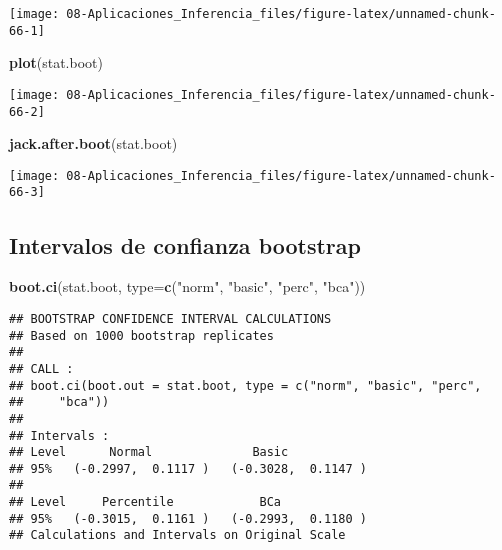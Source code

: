 \documentclass[
]{book}
\newenvironment{Shaded}{\begin{snugshade}}{\end{snugshade}}
\newcommand{\DataTypeTok}[1]{\textcolor[rgb]{0.13,0.29,0.53}{#1}}
\newcommand{\KeywordTok}[1]{\textcolor[rgb]{0.13,0.29,0.53}{\textbf{#1}}}
\newcommand{\NormalTok}[1]{#1}
\newcommand{\StringTok}[1]{\textcolor[rgb]{0.31,0.60,0.02}{#1}}
\theoremstyle{break}
\theoremstyle{definition}
\theoremstyle{definition}
\theoremstyle{definition}
\theoremstyle{remark}
\begin{document}
\begin{center}\texttt{[image: 08-Aplicaciones\_Inferencia\_files/figure-latex/unnamed-chunk-66-1]} \end{center}

\begin{Shaded}
\begin{Highlighting}[]
\KeywordTok{plot}\NormalTok{(stat.boot)}
\end{Highlighting}
\end{Shaded}

\begin{center}\texttt{[image: 08-Aplicaciones\_Inferencia\_files/figure-latex/unnamed-chunk-66-2]} \end{center}

\begin{Shaded}
\begin{Highlighting}[]
\KeywordTok{jack.after.boot}\NormalTok{(stat.boot)}
\end{Highlighting}
\end{Shaded}

\begin{center}\texttt{[image: 08-Aplicaciones\_Inferencia\_files/figure-latex/unnamed-chunk-66-3]} \end{center}

\hypertarget{intervalos-de-confianza-bootstrap}{%
\subsection{Intervalos de confianza bootstrap}\label{intervalos-de-confianza-bootstrap}}

\begin{Shaded}
\begin{Highlighting}[]
\KeywordTok{boot.ci}\NormalTok{(stat.boot, }\DataTypeTok{type=}\KeywordTok{c}\NormalTok{(}\StringTok{"norm"}\NormalTok{, }\StringTok{"basic"}\NormalTok{, }\StringTok{"perc"}\NormalTok{, }\StringTok{"bca"}\NormalTok{))}
\end{Highlighting}
\end{Shaded}

\begin{verbatim}
## BOOTSTRAP CONFIDENCE INTERVAL CALCULATIONS
## Based on 1000 bootstrap replicates
## 
## CALL : 
## boot.ci(boot.out = stat.boot, type = c("norm", "basic", "perc", 
##     "bca"))
## 
## Intervals : 
## Level      Normal              Basic         
## 95%   (-0.2997,  0.1117 )   (-0.3028,  0.1147 )  
## 
## Level     Percentile            BCa          
## 95%   (-0.3015,  0.1161 )   (-0.2993,  0.1180 )  
## Calculations and Intervals on Original Scale
\end{verbatim}
\end{document}
